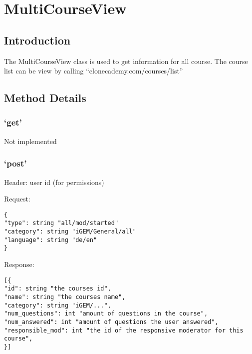 \chapter*{MultiCourseView}

\section*{Introduction}\label{introduction}

The MultiCourseView class is used to get information for all course. The
course list can be view by calling ``clonecademy.com/courses/list''

\section*{Method Details}\label{method-details}

\subsection*{\texorpdfstring{`get'}{get}}\label{get}

Not implemented

\subsection*{\texorpdfstring{`post'}{post}}\label{post}

Header: user id (for permissions)

Request:

\begin{verbatim}
{
"type": string "all/mod/started"
"category": string "iGEM/General/all"
"language": string "de/en"
}
\end{verbatim}

Response:

\begin{verbatim}
[{
"id": string "the courses id",
"name": string "the courses name",
"category": string "iGEM/...",
"num_questions": int "amount of questions in the course",
"num_answered": int "amount of questions the user answered",
"responsible_mod": int "the id of the responsive moderator for this course",
}]
\end{verbatim}
